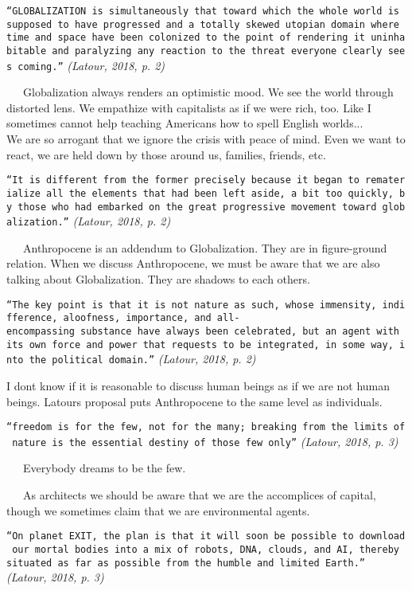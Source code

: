 \documentclass[
]{article}
\begin{document}
\texttt{“GLOBALIZATION\ is\ simultaneously\ that\ toward\ which\ the\ whole\ world\ is\ supposed\ to\ have\ progressed\ and\ a\ totally\ skewed\ utopian\ domain\ where\ time\ and\ space\ have\ been\ colonized\ to\ the\ point\ of\ rendering\ it\ uninhabitable\ and\ paralyzing\ any\ reaction\ to\ the\ threat\ everyone\ clearly\ sees\ coming.”}
\emph{(Latour, 2018, p. 2)}

~~~Globalization always renders an optimistic mood. We see the world
through distorted lens. We empathize with capitalists as if we were
rich, too. Like I sometimes cannot help teaching Americans how to spell
English worlds...\\
We are so arrogant that we ignore the crisis with peace of mind. Even we
want to react, we are held down by those around us, families, friends,
etc.

\texttt{“It\ is\ different\ from\ the\ former\ precisely\ because\ it\ began\ to\ rematerialize\ all\ the\ elements\ that\ had\ been\ left\ aside,\ a\ bit\ too\ quickly,\ by\ those\ who\ had\ embarked\ on\ the\ great\ progressive\ movement\ toward\ globalization.”}
\emph{(Latour, 2018, p. 2)}

~~~Anthropocene is an addendum to Globalization. They are in
figure-ground relation. When we discuss Anthropocene, we must be aware
that we are also talking about Globalization. They are shadows to each
others.

\texttt{“The\ key\ point\ is\ that\ it\ is\ not\ nature\ as\ such,\ whose\ immensity,\ indifference,\ aloofness,\ importance,\ and\ all-encompassing\ substance\ have\ always\ been\ celebrated,\ but\ an\ agent\ with\ its\ own\ force\ and\ power\ that\ requests\ to\ be\ integrated,\ in\ some\ way,\ into\ the\ political\ domain.”}
\emph{(Latour, 2018, p. 2)}

I don\textquotesingle t know if it is reasonable to discuss human beings
as if we are not human beings. Latour\textquotesingle s proposal puts
Anthropocene to the same level as individuals.

\texttt{“freedom\ is\ for\ the\ few,\ not\ for\ the\ many;\ breaking\ from\ the\ limits\ of\ nature\ is\ the\ essential\ destiny\ of\ those\ few\ only”}
\emph{(Latour, 2018, p. 3)}

~~~Everybody dreams to be the few.

~~~As architects we should be aware that we are the accomplices of
capital, though we sometimes claim that we are environmental agents.

\texttt{“On\ planet\ EXIT,\ the\ plan\ is\ that\ it\ will\ soon\ be\ possible\ to\ download\ our\ mortal\ bodies\ into\ a\ mix\ of\ robots,\ DNA,\ clouds,\ and\ AI,\ thereby\ situated\ as\ far\ as\ possible\ from\ the\ humble\ and\ limited\ Earth.”}
\emph{(Latour, 2018, p. 3)}
\end{document}
